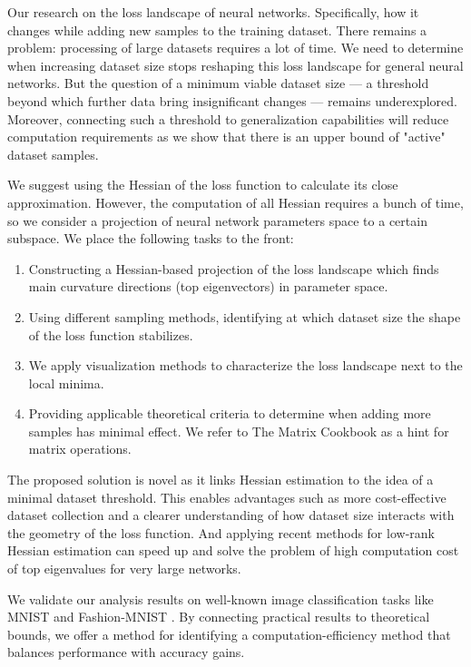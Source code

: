 \documentclass{article}
\begin{document}
Our research on the loss landscape of neural networks. Specifically, how it changes while adding new samples
to the training dataset. There remains a problem: processing of large datasets requires a lot of time.
We need to determine when increasing dataset size stops reshaping this loss landscape for general neural networks.
But the question of a minimum viable dataset size --- a threshold beyond which further data bring insignificant changes ---
remains underexplored. Moreover, connecting such a threshold to generalization capabilities \cite{wu2017towards} will
reduce computation requirements as we show that there is an upper bound of "active" dataset samples.

We suggest using the Hessian of the loss function to calculate its close approximation. However, the computation of all
Hessian requires a bunch of time, so we consider a projection of neural network parameters space to a certain subspace.
We place the following tasks to the front:
\begin{enumerate}
  \item Constructing a Hessian-based projection of the loss landscape which finds main curvature directions
        (top eigenvectors) in parameter space.
  \item Using different sampling methods, identifying at which dataset size the shape of the loss function stabilizes.
  \item We apply visualization methods to characterize the loss landscape next to the local minima.
  \item Providing applicable theoretical criteria to determine when adding more samples has minimal effect.
        We refer to The Matrix Cookbook \cite{petersen2012matrix} as a hint for matrix operations.
\end{enumerate}

The proposed solution is novel as it links Hessian estimation to the idea of a minimal dataset threshold. This enables
advantages such as more cost-effective dataset collection and a clearer understanding of how dataset size interacts with the
geometry of the loss function. And applying recent methods for low-rank Hessian estimation
can speed up and solve the problem of high computation cost of top eigenvalues for very large networks.

We validate our analysis results on well-known image classification tasks like MNIST \cite{deng2012mnist} and Fashion-MNIST
\cite{xiao2017fashion}. By connecting practical results to theoretical bounds, we offer a method for identifying
a computation-efficiency method that balances performance with accuracy gains.
\end{document}
